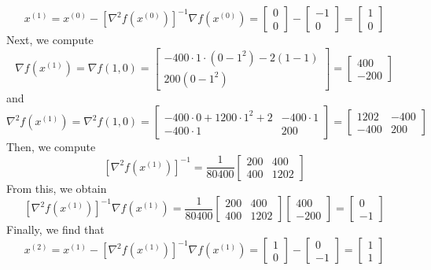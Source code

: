 \documentclass[12pt]{article}
\begin{document}
\[
x^{(1)} = x^{(0)} - [\nabla^2 f(x^{(0)})]^{-1} \nabla f(x^{(0)}) = \begin{bmatrix} 0 \\ 0
\end{bmatrix} - \begin{bmatrix} -1 \\ 0 \end{bmatrix} = \begin{bmatrix} 1 \\ 0 \end{bmatrix}
\] Next, we compute
\[
\nabla f(x^{(1)}) = \nabla f(1,0) = 
\begin{bmatrix}
 -400\cdot 1 \cdot (0 - 1^2) - 2(1-1)\\
 200(0 - 1^2)
\end{bmatrix}
= \begin{bmatrix}
400\\
-200
\end{bmatrix}
\] and
\[
\nabla^2 f(x^{(1)}) = \nabla^2 f(1,0) = \begin{bmatrix}
-400 \cdot 0 + 1200 \cdot 1^2 + 2 & -400\cdot 1\\
-400\cdot 1 & 200
\end{bmatrix} = 
\begin{bmatrix}
1202 & -400\\
-400 & 200
\end{bmatrix}
\] Then, we compute
\[
[\nabla^2 f(x^{(1)})]^{-1} = \frac{1}{80400} \begin{bmatrix}
200 & 400\\
400 & 1202
\end{bmatrix}
\] From this, we obtain
\[
[\nabla^2 f(x^{(1)})]^{-1} \nabla f(x^{(1)}) = \frac{1}{80400} \begin{bmatrix}
200 & 400\\
400 & 1202
\end{bmatrix} \begin{bmatrix}
400\\
-200
\end{bmatrix} = \begin{bmatrix}
0 \\ -1
\end{bmatrix}
\] Finally, we find that
\[
x^{(2)} = x^{(1)} - [\nabla^2 f(x^{(1)})]^{-1} \nabla f(x^{(1)}) = \begin{bmatrix} 1\\ 0 \end{bmatrix} - \begin{bmatrix} 0 \\ -1 \end{bmatrix} = \begin{bmatrix} 1 \\ 1
\end{bmatrix}
\]
\newpage
\end{document}
